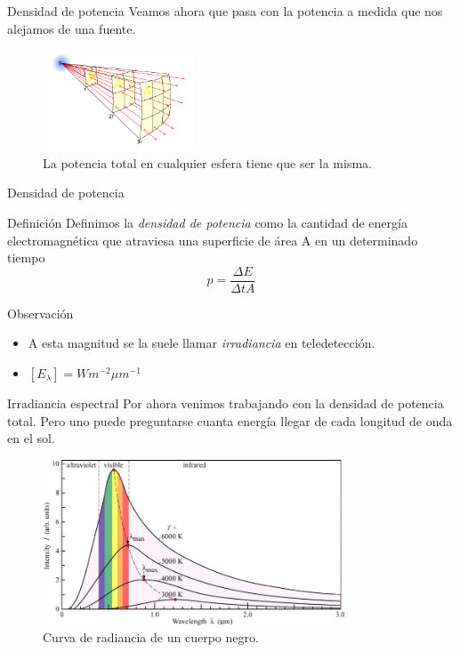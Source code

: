 \documentclass[]{beamer}
\begin{document}
\begin{frame}{Densidad de potencia}
  Veamos ahora que pasa con la potencia a medida que nos alejamos de una fuente.
  \begin{figure}
    \includegraphics[width=0.4\textwidth]{imagenes/inversesquare.png}
    \caption{La potencia total en cualquier esfera tiene que ser la misma. }
  \end{figure}
\end{frame}

\begin{frame}{Densidad de potencia}
  \begin{block}{Definición}
    Definimos la \emph{densidad de potencia} como la cantidad de energía electromagnética que atraviesa una superficie de área A en un determinado tiempo
    \begin{equation}
      p = \frac{\Delta E}{\Delta t A}
    \end{equation}
  \end{block}\pause
  \begin{block}{Observación}
  \begin{itemize}[<+->]
    \item A esta magnitud se la suele llamar \emph{irradiancia} en teledetección.
    \item $[E_\lambda] = W m^{-2} \mu m^{-1}$
  \end{itemize}
  \end{block}
\end{frame}

\begin{frame}{Irradiancia espectral}
  Por ahora venimos trabajando con la densidad de potencia total. Pero uno puede preguntarse cuanta energía llegar de cada longitud de onda en el sol.
  \begin{figure}
    \includegraphics[width=0.8\textwidth]{imagenes/black-body-radiation-curves.png}
    \caption{Curva de radiancia de un cuerpo negro.}
  \end{figure}
\end{frame}
\end{document}
